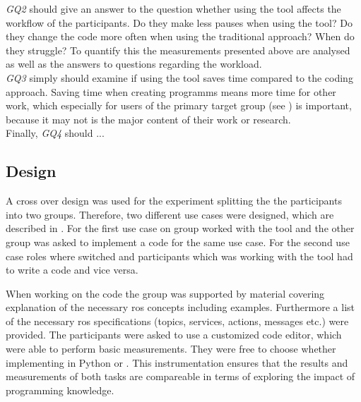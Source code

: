 \textit{GQ2} should give an answer to the question whether using the tool affects the workflow of the participants. Do they make less pauses when using the tool? Do they change the code more often when using the traditional approach? When do they struggle? To quantify this the measurements presented above are analysed as well as the answers to questions regarding the workload. \\

\textit{GQ3} simply should examine if using the tool saves time compared to the coding approach. Saving time when creating programms means more time for other work, which especially for users of the primary target group (see ) is important, because it may not is the major content of their work or research. \\

Finally, \textit{GQ4} should ...


\subsection{Design} \label{sub:ExprimentDesign}
A cross over design was used for the experiment splitting the the participants into two groups. Therefore, two different use cases were designed, which are described in . For the first use case on group worked with the tool and the other group was asked to implement a code for the same use case. For the second use case roles where switched and participants which was working with the tool had to write a code and vice versa.

When working on the code the group was supported by material covering explanation of the necessary \gls{ros} concepts including examples. Furthermore a list of the necessary \gls{ros} specifications (topics, services, actions, messages etc.) were provided. The participants were asked to use a customized code editor, which were able to perform basic measurements. They were free to choose whether implementing in Python or \Cpp{}. This instrumentation ensures that the results and measurements of both tasks are compareable in terms of exploring the impact of programming knowledge.

